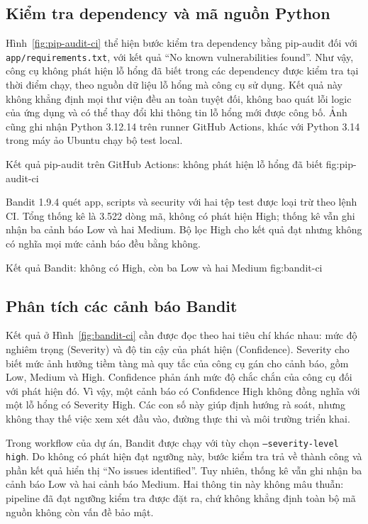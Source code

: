 \subsection{Kiểm tra dependency và mã nguồn Python}
Hình~\ref{fig:pip-audit-ci} thể hiện bước kiểm tra dependency bằng pip-audit đối với \nolinkurl{app/requirements.txt}, với kết quả ``No known vulnerabilities found''. Như vậy, công cụ không phát hiện lỗ hổng đã biết trong các dependency được kiểm tra tại thời điểm chạy, theo nguồn dữ liệu lỗ hổng mà công cụ sử dụng. Kết quả này không khẳng định mọi thư viện đều an toàn tuyệt đối, không bao quát lỗi logic của ứng dụng và có thể thay đổi khi thông tin lỗ hổng mới được công bố. Ảnh cũng ghi nhận Python 3.12.14 trên runner GitHub Actions, khác với Python 3.14 trong máy ảo Ubuntu chạy bộ test local.

{Kết quả pip-audit trên GitHub Actions: không phát hiện lỗ hổng đã biết}
{fig:pip-audit-ci}

Bandit 1.9.4 quét app, scripts và security với hai tệp test được loại trừ theo lệnh CI. Tổng thống kê là 3.522 dòng mã, không có phát hiện High; thống kê vẫn ghi nhận ba cảnh báo Low và hai Medium. Bộ lọc High cho kết quả đạt nhưng không có nghĩa mọi mức cảnh báo đều bằng không.

{Kết quả Bandit: không có High, còn ba Low và hai Medium}
{fig:bandit-ci}

\subsection{Phân tích các cảnh báo Bandit}
Kết quả ở Hình~\ref{fig:bandit-ci} cần được đọc theo hai tiêu chí khác nhau: mức độ nghiêm trọng (Severity) và độ tin cậy của phát hiện (Confidence). Severity cho biết mức ảnh hưởng tiềm tàng mà quy tắc của công cụ gán cho cảnh báo, gồm Low, Medium và High. Confidence phản ánh mức độ chắc chắn của công cụ đối với phát hiện đó. Vì vậy, một cảnh báo có Confidence High không đồng nghĩa với một lỗ hổng có Severity High. Các con số này giúp định hướng rà soát, nhưng không thay thế việc xem xét đầu vào, đường thực thi và môi trường triển khai.

Trong workflow của dự án, Bandit được chạy với tùy chọn \texttt{--severity-level high}. Do không có phát hiện đạt ngưỡng này, bước kiểm tra trả về thành công và phần kết quả hiển thị ``No issues identified''. Tuy nhiên, thống kê vẫn ghi nhận ba cảnh báo Low và hai cảnh báo Medium. Hai thông tin này không mâu thuẫn: pipeline đã đạt ngưỡng kiểm tra được đặt ra, chứ không khẳng định toàn bộ mã nguồn không còn vấn đề bảo mật.

